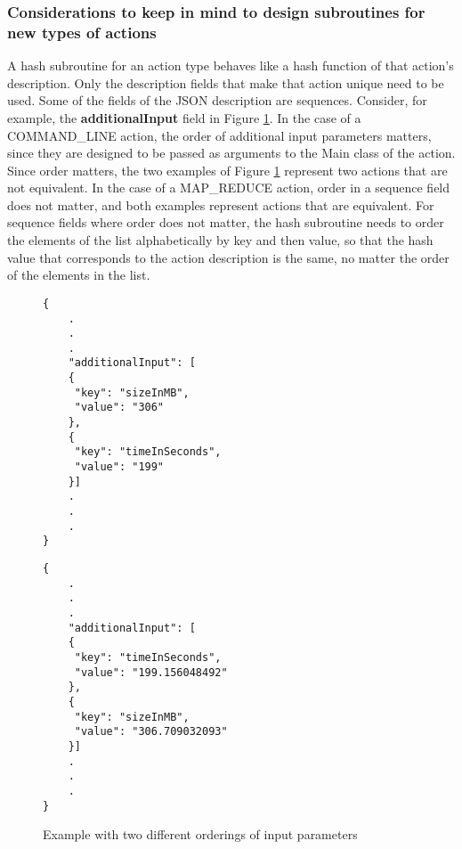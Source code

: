 \subsubsection{Considerations to keep in mind to design subroutines for new types of actions}
A hash subroutine for an action type behaves like a hash function of that action's description.  Only the description fields that make that action unique need to be used.  Some of the fields of the JSON description are sequences.  Consider, for example, the \textbf{additionalInput} field in Figure \ref{fig:action_parameters_ordering}.  In the case of a COMMAND\_LINE action, the order of additional input parameters matters, since they are designed to be passed as arguments to the Main class of the action.  Since order matters, the two examples of Figure \ref{fig:action_parameters_ordering} represent two actions that are not equivalent. In the case of a MAP\_REDUCE action, order in a sequence field does not matter, and both examples represent actions that are equivalent. For sequence fields where order does not matter, the hash subroutine needs to order the elements of the list alphabetically by key and then value, so that the hash value that corresponds to the action description is the same, no matter the order of the elements in the list.

\begin{figure}[htbp]
\centering
\begin{singlespace}
\begin{minipage}[b]{7 cm}
\begin{mdframed}
\begin{verbatim}
{
    .
    .
    .
    "additionalInput": [
    {
     "key": "sizeInMB",
     "value": "306"
    }, 
    {
     "key": "timeInSeconds", 
     "value": "199"
    }]
    .
    .
    .
}
\end{verbatim}
\end{mdframed}
\end{minipage}
\begin{minipage}[b]{7 cm}
\begin{mdframed}
\begin{verbatim}
{
    .
    .
    .
    "additionalInput": [
    {
     "key": "timeInSeconds", 
     "value": "199.156048492"
    },
    {
     "key": "sizeInMB",
     "value": "306.709032093"
    }]
    .
    .
    .
}
\end{verbatim}
\end{mdframed}
\end{minipage}
\end{singlespace}
\caption{Example with two different orderings of input parameters}
\label{fig:action_parameters_ordering}
\end{figure}



